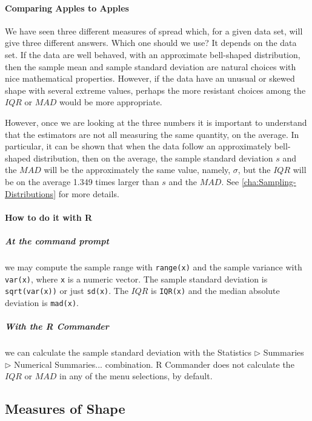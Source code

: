 \documentclass[captions=tableheading]{scrbook}
\begin{document}
\paragraph*{Comparing Apples to Apples}

We have seen three different measures of spread which, for a given data set, will give three different answers. Which one should we use? It depends on the data set. If the data are well behaved, with an approximate bell-shaped distribution, then the sample mean and sample standard deviation are natural choices with nice mathematical properties. However, if the data have an unusual or skewed shape with several extreme values, perhaps the more resistant choices among the \(IQR\) or \(MAD\) would be more appropriate.

However, once we are looking at the three numbers it is important to understand that the estimators are not all measuring the same quantity, on the average. In particular, it can be shown that when the data follow an approximately bell-shaped distribution, then on the average, the sample standard deviation \(s\) and the \(MAD\) will be the approximately the same value, namely, \(\sigma\), but the \(IQR\) will be on the average 1.349 times larger than \(s\) and the \(MAD\). See \ref{cha:Sampling-Distributions} for more details.


\paragraph*{How to do it with \textsf{R}}

\subparagraph*{At the command prompt}
we may compute the sample range with \texttt{range(x)} and the sample variance with \texttt{var(x)}, where \texttt{x} is a numeric vector. The sample standard deviation is \texttt{sqrt(var(x))} or just \texttt{sd(x)}. The \(IQR\) is \texttt{IQR(x)} and the median absolute deviation is \texttt{mad(x)}.

\subparagraph*{With the \textsf{R} Commander}
we can calculate the sample standard deviation with the \textsf{Statistics \(\triangleright\) Summaries \(\triangleright\) Numerical Summaries}... combination. \textsf{R} Commander does not calculate the \(IQR\) or \(MAD\) in any of the menu selections, by default.
\subsection{Measures of Shape}
\label{sec-3-3-5}

\label{sub:Measures-of-Shape}
\end{document}
